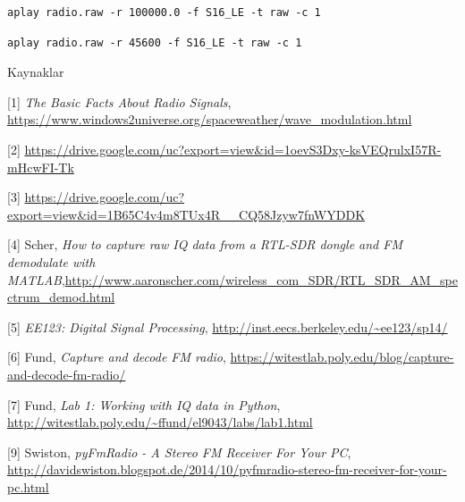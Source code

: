 \documentclass[12pt,fleqn]{article}\usepackage{../../common}
\begin{document}
\begin{verbatim}
aplay radio.raw -r 100000.0 -f S16_LE -t raw -c 1
\end{verbatim}

\begin{verbatim}
aplay radio.raw -r 45600 -f S16_LE -t raw -c 1
\end{verbatim}

Kaynaklar

[1] {\em The Basic Facts About Radio Signals}, \url{https://www.windows2universe.org/spaceweather/wave_modulation.html}

[2] \url{https://drive.google.com/uc?export=view&id=1oevS3Dxy-ksVEQrulxI57R-mHcwFI-Tk}

[3] \url{https://drive.google.com/uc?export=view&id=1B65C4v4m8TUx4R__CQ58Jzyw7fnWYDDK}

[4] Scher, {\em How to capture raw IQ data from a RTL-SDR dongle and FM demodulate with MATLAB},\url{http://www.aaronscher.com/wireless_com_SDR/RTL_SDR_AM_spectrum_demod.html}

[5] {\em EE123: Digital Signal Processing}, \url{http://inst.eecs.berkeley.edu/~ee123/sp14/}

[6] Fund, {\em Capture and decode FM radio}, \url{https://witestlab.poly.edu/blog/capture-and-decode-fm-radio/}

[7] Fund, {\em Lab 1: Working with IQ data in Python}, \url{http://witestlab.poly.edu/~ffund/el9043/labs/lab1.html}

[9] Swiston, {\em pyFmRadio - A Stereo FM Receiver For Your PC}, \url{http://davidswiston.blogspot.de/2014/10/pyfmradio-stereo-fm-receiver-for-your-pc.html}
\end{document}
